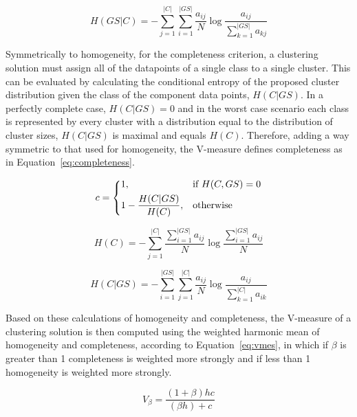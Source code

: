 \begin{equation}
 H(GS|C) = - \sum_{j=1}^{|C|} \sum_{i=1}^{|GS|} \frac{a_{ij}}{N}
           \log \frac{a_{ij}}{\sum_{k=1}^{|GS|} a_{kj}}
\end{equation}

Symmetrically to homogeneity, for the completeness criterion, a clustering
solution must assign all of the datapoints of a single class to a single
cluster. This can be evaluated by calculating the conditional entropy of the
proposed cluster distribution given the class of the component data points,
$H(C|GS)$. In a perfectly complete case, $H(C|GS) = 0$ and in the worst case
scenario each class is represented by every cluster with a distribution equal to
the distribution of cluster sizes, $H(C|GS)$ is maximal and equals $H(C)$.
Therefore, adding a way symmetric to that used for homogeneity, the V-measure
defines completeness as in Equation~\ref{eq:completeness}.

\begin{equation} \label{eq:completeness}
 c = \begin{dcases}
      1,                        & \text{if } H(C,GS) = 0 \\
      1 - \frac{H(C|GS)}{H(C)}, & \text{otherwise} \\
     \end{dcases}
\end{equation}

\begin{equation}
 H(C) = - \sum_{j=1}^{|C|} \frac{\sum_{i=1}^{|GS|} a_{ij}}{N}
        \log \frac{\sum_{i=1}^{|GS|} a_{ij}}{N}
\end{equation}

\begin{equation}
 H(C|GS) = - \sum_{i=1}^{|GS|} \sum_{j=1}^{|C|} \frac{a_{ij}}{N}
           \log \frac{a_{ij}}{\sum_{k=1}^{|C|} a_{ik}}
\end{equation}

Based on these calculations of homogeneity and completeness, the V-measure of a
clustering solution is then computed using the weighted harmonic mean of
homogeneity and completeness, according to Equation~\ref{eq:vmes}, in which if
$\beta$ is greater than 1 completeness is weighted more strongly and if less
than 1 homogeneity is weighted more strongly.

\begin{equation} \label{eq:vmes}
 V_\beta = \frac{(1+\beta)hc}{(\beta h) + c}
\end{equation}

